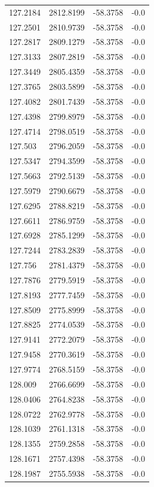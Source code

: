 \begin{table}[H]
\begin{tabular}{llll}
127.2184 & 2812.8199 & -58.3758 & -0.0 \\
127.2501 & 2810.9739 & -58.3758 & -0.0 \\
127.2817 & 2809.1279 & -58.3758 & -0.0 \\
127.3133 & 2807.2819 & -58.3758 & -0.0 \\
127.3449 & 2805.4359 & -58.3758 & -0.0 \\
127.3765 & 2803.5899 & -58.3758 & -0.0 \\
127.4082 & 2801.7439 & -58.3758 & -0.0 \\
127.4398 & 2799.8979 & -58.3758 & -0.0 \\
127.4714 & 2798.0519 & -58.3758 & -0.0 \\
127.503 & 2796.2059 & -58.3758 & -0.0 \\
127.5347 & 2794.3599 & -58.3758 & -0.0 \\
127.5663 & 2792.5139 & -58.3758 & -0.0 \\
127.5979 & 2790.6679 & -58.3758 & -0.0 \\
127.6295 & 2788.8219 & -58.3758 & -0.0 \\
127.6611 & 2786.9759 & -58.3758 & -0.0 \\
127.6928 & 2785.1299 & -58.3758 & -0.0 \\
127.7244 & 2783.2839 & -58.3758 & -0.0 \\
127.756 & 2781.4379 & -58.3758 & -0.0 \\
127.7876 & 2779.5919 & -58.3758 & -0.0 \\
127.8193 & 2777.7459 & -58.3758 & -0.0 \\
127.8509 & 2775.8999 & -58.3758 & -0.0 \\
127.8825 & 2774.0539 & -58.3758 & -0.0 \\
127.9141 & 2772.2079 & -58.3758 & -0.0 \\
127.9458 & 2770.3619 & -58.3758 & -0.0 \\
127.9774 & 2768.5159 & -58.3758 & -0.0 \\
128.009 & 2766.6699 & -58.3758 & -0.0 \\
128.0406 & 2764.8238 & -58.3758 & -0.0 \\
128.0722 & 2762.9778 & -58.3758 & -0.0 \\
128.1039 & 2761.1318 & -58.3758 & -0.0 \\
128.1355 & 2759.2858 & -58.3758 & -0.0 \\
128.1671 & 2757.4398 & -58.3758 & -0.0 \\
128.1987 & 2755.5938 & -58.3758 & -0.0 \\

\end{tabular}
\end{table}
